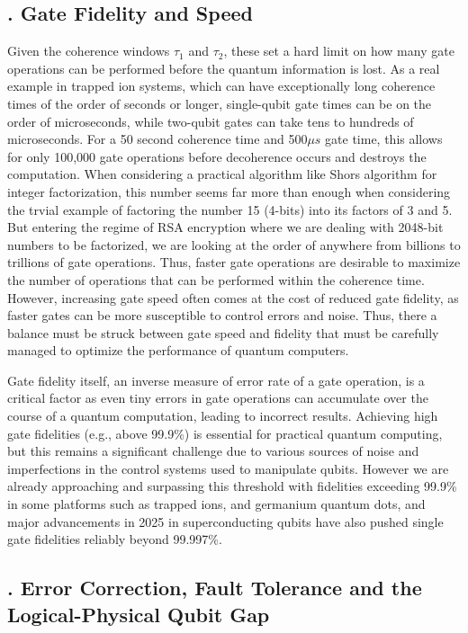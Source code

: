 \documentclass{elbioimp2}
\begin{document}
\subsection{. Gate Fidelity and Speed}
Given the coherence windows $\tau_1$ and $\tau_2$, these set a hard limit on how many gate operations can be performed before the quantum information is lost. As a real example in trapped ion systems, which can have exceptionally long coherence times of the order of seconds or longer, single-qubit gate times can be on the order of microseconds, while two-qubit gates can take tens to hundreds of microseconds. For a 50 second coherence time and 500$\mu s$ gate time, this allows for only 100,000 gate operations before decoherence occurs and destroys the computation. When considering a practical algorithm like Shors algorithm for integer factorization, this number seems far more than enough when considering the trvial example of factoring the number 15 (4-bits) into its factors of 3 and 5. But entering the regime of RSA encryption where we are dealing with 2048-bit numbers to be factorized, we are looking at the order of anywhere from billions to trillions of gate operations. Thus, faster gate operations are desirable to maximize the number of operations that can be performed within the coherence time. However, increasing gate speed often comes at the cost of reduced gate fidelity, as faster gates can be more susceptible to control errors and noise. Thus, there a balance must be struck between gate speed and fidelity that must be carefully managed to optimize the performance of quantum computers.

Gate fidelity itself, an inverse measure of error rate of a gate operation, is a critical factor as even tiny errors in gate operations can accumulate over the course of a quantum computation, leading to incorrect results. Achieving high gate fidelities (e.g., above 99.9\%)\cite{99.9percent-required-fidelity} is essential for practical quantum computing, but this remains a significant challenge due to various sources of noise and imperfections in the control systems used to manipulate qubits. However we are already approaching and surpassing this threshold with fidelities exceeding 99.9\% in some platforms such as trapped ions, and germanium quantum dots\cite{Srinivas_2021,gemanium999}, and major advancements in 2025 in superconducting qubits have also pushed single gate fidelities reliably beyond 99.997\%\cite{PRXQuantum.5.040342}.

\subsection{. Error Correction, Fault Tolerance and the Logical-Physical Qubit Gap}
\end{document}
